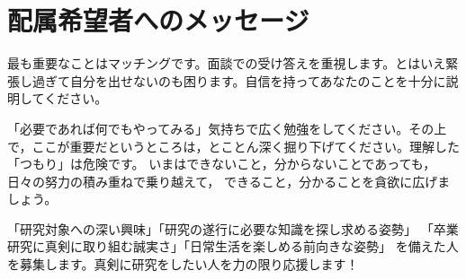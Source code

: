 \documentclass[uplatex,jis2004,a4paper,11pt]{jsarticle}
\begin{document}
\section{配属希望者へのメッセージ}

最も重要なことはマッチングです。面談での受け答えを重視します。とはいえ緊張し過ぎて自分を出せないのも困ります。自信を持ってあなたのことを十分に説明してください。

「必要であれば何でもやってみる」気持ちで広く勉強をしてください。その上で，ここが重要だというところは，とことん深く掘り下げてください。理解した「つもり」は危険です。
いまはできないこと，分からないことであっても，日々の努力の積み重ねで乗り越えて，
できること，分かることを貪欲に広げましょう。

「研究対象への深い興味」「研究の遂行に必要な知識を探し求める姿勢」
「卒業研究に真剣に取り組む誠実さ」「日常生活を楽しめる前向きな姿勢」
を備えた人を募集します。真剣に研究をしたい人を力の限り応援します！

%
%
\end{document}
